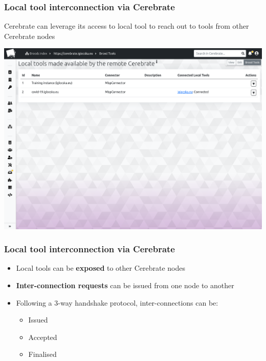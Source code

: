 \begin{frame}
\frametitle{Local tool interconnection via Cerebrate}
    Cerebrate can leverage its access to local tool to reach out to tools from other Cerebrate nodes
    \begin{center}
        \includegraphics[width=0.85\linewidth]{pictures/tools-made-available.png}
    \end{center}
\end{frame}

\begin{frame}
\frametitle{Local tool interconnection via Cerebrate}
    \begin{itemize}
        \item Local tools can be \textbf{exposed} to other Cerebrate nodes
        \item \textbf{Inter-connection requests} can be issued from one node to another
        \item Following a 3-way handshake protocol, inter-connections can be:
        \begin{itemize}
            \item Issued
            \item Accepted
            \item Finalised
        \end{itemize}
    \end{itemize}
\end{frame}

